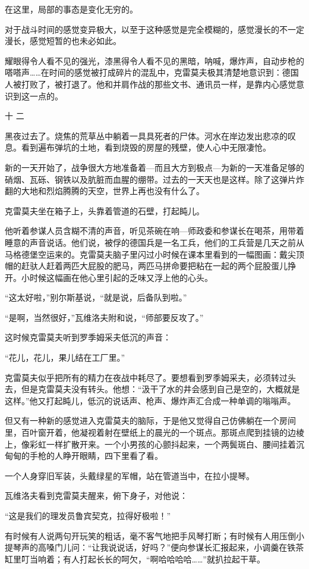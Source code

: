 在这里，局部的事态是变化无穷的。

对于战斗时间的感觉变异极大，以至于这种感觉是完全模糊的，感觉漫长的不一定漫长，感觉短暂的也未必如此。

耀眼得令人看不见的强光，漆黑得令人看不见的黑暗，呐喊，爆炸声，自动步枪的嗒嗒声……在时间的感觉被打成碎片的混乱中，克雷莫夫极其清楚地意识到：德国人被打败了，被打退了。他和并肩作战的那些文书、通讯员一样，是靠内心感觉意识到这一点的。

十 二

黑夜过去了。烧焦的荒草丛中躺着一具具死者的尸体。河水在岸边发出悲凉的叹息。看到遍布弹坑的土地，看到烧毁的房屋的残壁，使人心中无限凄怆。

新的一天开始了，战争很大方地准备着—而且大方到极点—为新的一天准备足够的硝烟、瓦砾、钢铁以及肮脏而血腥的绷带。过去的一天天也是这样。除了这弹片炸翻的大地和烈焰腾腾的天空，世界上再也没有什么了。

克雷莫夫坐在箱子上，头靠着管道的石壁，打起盹儿。

他听着参谋人员含糊不清的声音，听见茶碗在响—师政委和参谋长在喝茶，用带着睡意的声音说话。他们说，被俘的德国兵是一名工兵，他们的工兵营是几天之前从马格德堡空运来的。克雷莫夫脑子里闪过小时候在课本里看到的一幅图画：戴尖顶帽的赶驮人赶着两匹大屁股的肥马，两匹马拼命要把粘在一起的两个屁股蛋儿挣开。小时候这幅画在他心里引起的乏味又浮上他的心头。

“这太好啦，”别尔斯基说，“就是说，后备队到啦。”

“是啊，当然很好，”瓦维洛夫附和说，“师部要反攻了。”

这时候克雷莫夫听到罗季姆采夫低沉的声音：

“花儿，花儿，果儿结在工厂里。”

克雷莫夫似乎把所有的精力在夜战中耗尽了。要想看到罗季姆采夫，必须转过头去，但是克雷莫夫没有转头。他想：“汲干了水的井会感到自己是空的，大概就是这样。”他又打起盹儿，低沉的说话声、枪声、爆炸声汇合成一种单调的嗡嗡声。

但又有一种新的感觉进入克雷莫夫的脑际，于是他又觉得自己仿佛躺在一个房间里，百叶窗开着，他凝视着射在壁纸上的晨光的一个斑点。那斑点爬到挂镜的边棱上，像彩虹一样扩散开来。一个小男孩的心颤抖起来，一个两鬓斑白、腰间挂着沉甸甸的手枪的人睁开眼睛，四下里看了看。

一个人身穿旧军装，头戴绿星的军帽，站在管道当中，在拉小提琴。

瓦维洛夫看到克雷莫夫醒来，俯下身子，对他说：

“这是我们的理发员鲁宾契克，拉得好极啦！”

有时候有人说两句开玩笑的粗话，毫不客气地把手风琴打断；有时候有人用压倒小提琴声的高嗓门儿问：“让我说说话，好吗？”便向参谋长汇报起来，小调羹在铁茶缸里叮当响着；有人打起长长的呵欠，“啊哈哈哈哈……”就扒拉起干草。

